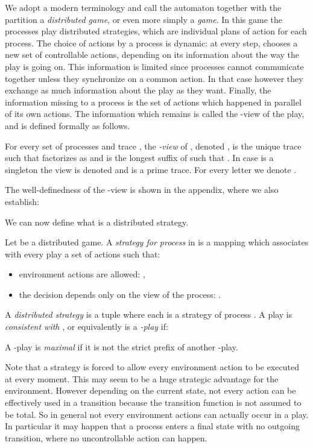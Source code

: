 \documentclass[a4paper,UKenglish]{lipics-v2016}
\begin{document}
We adopt a modern terminology and call the automaton  together with the partition
 a \emph{distributed game}, or even more simply a \emph{game}.
In this game the processes play distributed strategies,
which are individual plans of action for each process.
The choice of actions by a process  is dynamic: at every step,  chooses a new set of controllable actions, depending on its  information about the way the play is going on. This information is limited since
processes cannot communicate together unless they synchronize on a
common action. In that case however they exchange as much information about the play as they want.
Finally, the information missing to a process is the set of actions which happened in parallel of its own actions.
The information which remains is called the -view of the play,
and is defined formally as follows.







\begin{definition}[Views]\label{def:views}
For every set of processes 
and trace ,
the \emph{-view} of , denoted ,
 is the unique trace such that
  factorizes as
 and
 is the longest suffix of  such that 
.
In case  is a singleton  the view is denoted
 and is a prime trace.
For every letter  we denote .
\end{definition}

The well-definedness of the -view is shown in the appendix, where we also establish:


We can now define what is a distributed strategy.

\begin{definition}
Let  be a distributed game.
A \emph{strategy for process } in  is a mapping
which associates with every play  a set of actions  such that:
\begin{itemize}
\item
environment actions are allowed: ,
\item
the decision depends only on the view of the process:
.
\end{itemize}
A \emph{distributed strategy}
 is a tuple 
where each  is a strategy of process .
A play  is \emph{consistent with },
or equivalently is a \emph{-play} if:

A -play is \emph{maximal} if it is not the strict prefix of another -play.
\end{definition}

Note that a strategy is forced to allow every environment action to be executed at every moment.
This may seem to be a huge strategic advantage for the environment.
However depending on the current state,
not every action can be effectively used in a transition
because the transition function is not assumed to be total.
So in general not every environment actions can actually occur in a play.
In particular it may happen that a process enters a final state
with no outgoing transition, where
no uncontrollable action can happen.
 
\end{document}
